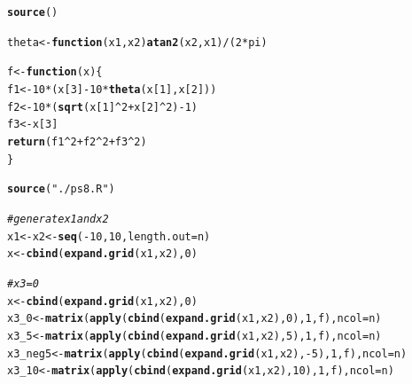 \documentclass{article}\usepackage[]{graphicx}\usepackage[]{color}
\makeatletter
\newcommand{\hlnum}[1]{\textcolor[rgb]{0.686,0.059,0.569}{#1}}%
\newcommand{\hlstr}[1]{\textcolor[rgb]{0.192,0.494,0.8}{#1}}%
\newcommand{\hlcom}[1]{\textcolor[rgb]{0.678,0.584,0.686}{\textit{#1}}}%
\newcommand{\hlopt}[1]{\textcolor[rgb]{0,0,0}{#1}}%
\newcommand{\hlstd}[1]{\textcolor[rgb]{0.345,0.345,0.345}{#1}}%
\newcommand{\hlkwa}[1]{\textcolor[rgb]{0.161,0.373,0.58}{\textbf{#1}}}%
\newcommand{\hlkwb}[1]{\textcolor[rgb]{0.69,0.353,0.396}{#1}}%
\newcommand{\hlkwc}[1]{\textcolor[rgb]{0.333,0.667,0.333}{#1}}%
\newcommand{\hlkwd}[1]{\textcolor[rgb]{0.737,0.353,0.396}{\textbf{#1}}}%
\newenvironment{kframe}{%
 \def\at@end@of@kframe{}%
 \ifinner\ifhmode%
  \def\at@end@of@kframe{\end{minipage}}%
  \begin{minipage}{\columnwidth}%
 \fi\fi%
 \def\FrameCommand##1{\hskip\@totalleftmargin \hskip-\fboxsep
 \colorbox{shadecolor}{##1}\hskip-\fboxsep
     \hskip-\linewidth \hskip-\@totalleftmargin \hskip\columnwidth}%
 \MakeFramed {\advance\hsize-\width
   \@totalleftmargin\z@ \linewidth\hsize
   \@setminipage}}%
 {\par\unskip\endMakeFramed%
 \at@end@of@kframe}
\newenvironment{knitrout}{}{} %
\makeatother
\begin{document}
\begin{knitrout}
\color{fgcolor}\begin{kframe}
\begin{alltt}
\hlkwd{source}\hlstd{()}
\end{alltt}


{\ttfamily\noindent\bfseries{}}\begin{alltt}
\hlstd{theta} \hlkwb{<-} \hlkwa{function}\hlstd{(}\hlkwc{x1}\hlstd{,}\hlkwc{x2}\hlstd{)} \hlkwd{atan2}\hlstd{(x2, x1)}\hlopt{/}\hlstd{(}\hlnum{2}\hlopt{*}\hlstd{pi)}

\hlstd{f} \hlkwb{<-} \hlkwa{function}\hlstd{(}\hlkwc{x}\hlstd{) \{}
  \hlstd{f1} \hlkwb{<-} \hlnum{10}\hlopt{*}\hlstd{(x[}\hlnum{3}\hlstd{]} \hlopt{-} \hlnum{10}\hlopt{*}\hlkwd{theta}\hlstd{(x[}\hlnum{1}\hlstd{],x[}\hlnum{2}\hlstd{]))}
  \hlstd{f2} \hlkwb{<-} \hlnum{10}\hlopt{*}\hlstd{(}\hlkwd{sqrt}\hlstd{(x[}\hlnum{1}\hlstd{]}\hlopt{^}\hlnum{2} \hlopt{+} \hlstd{x[}\hlnum{2}\hlstd{]}\hlopt{^}\hlnum{2}\hlstd{)} \hlopt{-} \hlnum{1}\hlstd{)}
  \hlstd{f3} \hlkwb{<-} \hlstd{x[}\hlnum{3}\hlstd{]}
  \hlkwd{return}\hlstd{(f1}\hlopt{^}\hlnum{2} \hlopt{+} \hlstd{f2}\hlopt{^}\hlnum{2} \hlopt{+} \hlstd{f3}\hlopt{^}\hlnum{2}\hlstd{)}
\hlstd{\}}

\hlkwd{source}\hlstd{(}\hlstr{"./ps8.R"}\hlstd{)}

\hlcom{#generate x1 and x2}
\hlstd{x1} \hlkwb{<-} \hlstd{x2} \hlkwb{<-} \hlkwd{seq}\hlstd{(}\hlopt{-}\hlnum{10}\hlstd{,} \hlnum{10}\hlstd{,} \hlkwc{length.out} \hlstd{= n)}
\hlstd{x} \hlkwb{<-} \hlkwd{cbind}\hlstd{(}\hlkwd{expand.grid}\hlstd{(x1, x2),} \hlnum{0}\hlstd{)}

\hlcom{#x3 = 0}
\hlstd{x} \hlkwb{<-} \hlkwd{cbind}\hlstd{(}\hlkwd{expand.grid}\hlstd{(x1, x2),} \hlnum{0}\hlstd{)}
\hlstd{x3_0}    \hlkwb{<-} \hlkwd{matrix}\hlstd{(}\hlkwd{apply}\hlstd{(}\hlkwd{cbind}\hlstd{(}\hlkwd{expand.grid}\hlstd{(x1, x2),} \hlnum{0}\hlstd{),} \hlnum{1}\hlstd{, f),} \hlkwc{ncol} \hlstd{= n)}
\hlstd{x3_5}    \hlkwb{<-} \hlkwd{matrix}\hlstd{(}\hlkwd{apply}\hlstd{(}\hlkwd{cbind}\hlstd{(}\hlkwd{expand.grid}\hlstd{(x1, x2),} \hlnum{5}\hlstd{),} \hlnum{1}\hlstd{, f),} \hlkwc{ncol} \hlstd{= n)}
\hlstd{x3_neg5} \hlkwb{<-} \hlkwd{matrix}\hlstd{(}\hlkwd{apply}\hlstd{(}\hlkwd{cbind}\hlstd{(}\hlkwd{expand.grid}\hlstd{(x1, x2),} \hlopt{-}\hlnum{5}\hlstd{),} \hlnum{1}\hlstd{, f),} \hlkwc{ncol} \hlstd{= n)}
\hlstd{x3_10}   \hlkwb{<-} \hlkwd{matrix}\hlstd{(}\hlkwd{apply}\hlstd{(}\hlkwd{cbind}\hlstd{(}\hlkwd{expand.grid}\hlstd{(x1, x2),} \hlnum{10}\hlstd{),} \hlnum{1}\hlstd{, f),} \hlkwc{ncol} \hlstd{= n)}


\end{alltt}
\end{kframe}
\end{knitrout}
\end{document}
